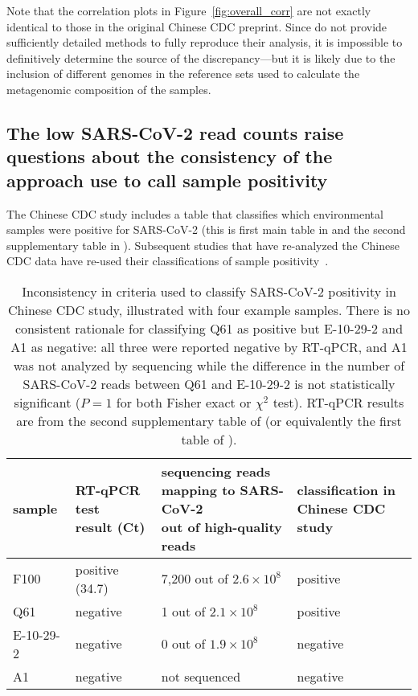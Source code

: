 \documentclass[9pt,twocolumn,twoside]{gsajnl_modified}
\begin{document}
Note that the correlation plots in Figure~\ref{fig:overall_corr} are not exactly identical to those in the original Chinese CDC preprint.
Since \citet{liu2022surveillance} do not provide sufficiently detailed methods to fully reproduce their analysis, it is impossible to definitively determine the source of the discrepancy---but it is likely due to the inclusion of different genomes in the reference sets used to calculate the metagenomic composition of the samples.

\subsection{The low SARS-CoV-2 read counts raise questions about the consistency of the approach use to call sample positivity}
The Chinese CDC study includes a table that classifies which environmental samples were positive for SARS-CoV-2 (this is first main table in \citet{liu2022surveillance} and the second supplementary table in \citet{liu2023surveillance}).
Subsequent studies that have re-analyzed the Chinese CDC data have re-used their classifications of sample positivity~\citep{worobey2022huanan,courtier2022sars,crits2023genetic}.

\begin{table}
\caption{
Inconsistency in criteria used to classify SARS-CoV-2 positivity in Chinese CDC study, illustrated with four example samples.
There is no consistent rationale for classifying Q61 as positive but E-10-29-2 and A1 as negative: all three were reported negative by RT-qPCR, and A1 was not analyzed by sequencing while the difference in the number of SARS-CoV-2 reads between Q61 and E-10-29-2 is not statistically significant ($P = 1$ for both Fisher exact or $\chi^2$ test).
RT-qPCR results are from the second supplementary table of \citet{liu2023surveillance} (or equivalently the first table of \citet{liu2022surveillance}).
\label{tab:consistency}
}
{\footnotesize
\setlength{\tabcolsep}{5pt}
\renewcommand{\arraystretch}{1.3}
\begin{tabular}{llll}
\toprule
sample & \makecell[l]{RT-qPCR test \\ result (Ct)} & \makecell[l]{sequencing reads \\ mapping to SARS-CoV-2 \\ out of high-quality reads} & \makecell[l]{classification in \\ Chinese CDC study} \\
\midrule
F100 & positive (34.7) & 7,200 out of $2.6 \times 10^8$ & positive \\
Q61 & negative & 1 out of $2.1 \times 10^8$ & positive \\
E-10-29-2 & negative & 0 out of $1.9 \times 10^8$ & negative \\
A1 & negative & not sequenced & negative \\
\bottomrule
\end{tabular}
}
\end{table}
\end{document}

